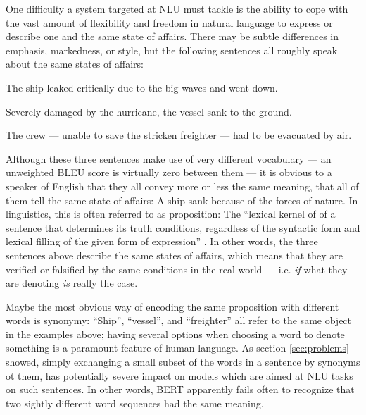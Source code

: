 One difficulty a system targeted at NLU must tackle is the ability to cope with the
vast amount of flexibility and freedom in natural language to express or describe
one and the same state of affairs. There may be subtle differences in emphasis,
markedness, or style, but the following sentences all roughly speak about the same
states of affairs:

\begin{examples}
  \item The ship leaked critically due to the big waves and went down.
  \item \label{ex:sinking-sent} Severely damaged by the hurricane, the vessel sank to the ground.
  \item The crew --- unable to save the stricken freighter --- had to be evacuated by air.
\end{examples}

Although these three sentences make use of very different vocabulary --- an unweighted BLEU score
is virtually zero between them --- it is obvious to a speaker of English that they all convey more
or less the same meaning, that all of them tell the same state of affairs: A ship sank because
of the forces of nature. In linguistics, this is often referred to as proposition: The ``lexical
kernel of of a sentence that determines its truth conditions, regardless of the syntactic form and
lexical filling of the given form of expression'' \cite[p.~959]{bussmann2006routledge}. In other
words, the three sentences above describe the same states of affairs, which means that they are
verified or falsified by the same conditions in the real world --- i.e. \emph{if} what they are
denoting \emph{is} really the case.

Maybe the most obvious way of encoding the same proposition with different words is synonymy:
``Ship'', ``vessel'', and ``freighter'' all refer to the same object in the examples above;
having several options when choosing a word to denote something is a paramount feature of human
language. As section \ref{sec:problems} showed, simply exchanging a small subset of the words
in a sentence by synonyms ot them, has potentially severe impact on models which are aimed at
NLU tasks on such sentences. In other words, BERT apparently fails often to recognize that two
sightly different word sequences had the same meaning.

